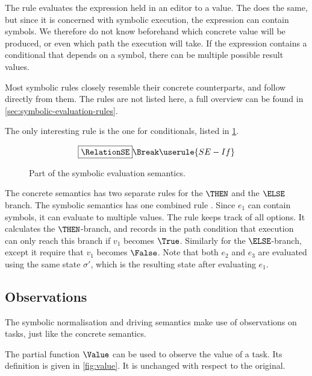 The  rule evaluates the expression held in an editor to a value.
The  does the same, but since it is concerned with symbolic execution, the expression can contain symbols.
We therefore do not know beforehand which concrete value will be produced, or even which path the execution will take.
If the expression contains a conditional that depends on a symbol, there can be multiple possible result values.


Most symbolic rules closely resemble their concrete counterparts, and follow directly from them.
The rules are not listed here, a full overview can be found in \cref{sec:symbolic-evaluation-rules}.

The only interesting rule is the one for conditionals, listed in \cref{fig:eval}.
\begin{figure}[h]
  \small
  \begin{gather*}
    \boxed{\RelationSE} \Break
    \userule{SE-If}
  \end{gather*}
  \caption{Part of the symbolic evaluation semantics.}
  \label{fig:eval}
\end{figure}
The concrete semantics has two separate rules for the $\THEN$ and the $\ELSE$ branch.
The symbolic semantics has one combined rule .
Since $e_1$ can contain symbols, it can evaluate to multiple values.
The rule keeps track of all options.
It calculates the $\THEN$-branch, and records in the path condition that execution can only reach this branch if $v_1$ becomes $\True$.
Similarly for the $\ELSE$-branch, except it require that $v_1$ becomes $\False$.
Note that both $e_2$ and $e_3$ are evaluated using the same state $\sigma'$,
which is the resulting state after evaluating $e_1$.



\subsection{Observations}
\label{subsec:observations}

The symbolic normalisation and driving semantics make use of observations on tasks, just like the concrete semantics.

The partial function $\Value$ can be used to observe the value of a task.
Its definition is given in \cref{fig:value}.
It is unchanged with respect to the original.

